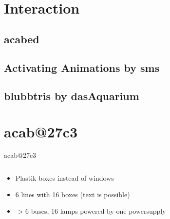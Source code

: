 \documentclass{beamer}
\begin{document}
\section{Interaction}
    \subsection{acabed}
    \subsection{Activating Animations by sms}
    \subsection{blubbtris by dasAquarium}
\section{acab@27c3}
  \begin{frame}{acab@27c3}
    \begin{columns}
      \begin{column}{9cm}
            \begin{itemize}
               \item Plastik boxes instead of windows
               \item 6 lines with 16 boxes (text is possible)
               \item -> 6 buses, 16 lamps powered by one powersupply
               \end{itemize}
      \end{column}
   \end{columns}
  \end{frame}
\end{document}
